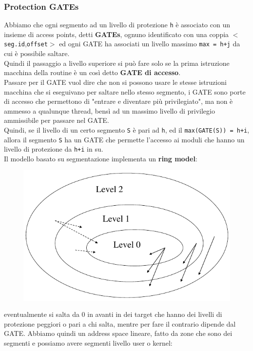 \documentclass[12pt, oneside]{extbook}
\begin{document}
\subsubsection{Protection GATEs} 
Abbiamo che ogni segmento ad un livello di protezione \texttt{h} è  associato con un insieme di access points, detti \textbf{GATEs}, ognuno identificato con una coppia $<$\texttt{seg.id},\texttt{offset}$>$ ed ogni GATE ha associati un livello massimo \texttt{max = h+j} da cui è possibile saltare.\\ Quindi il passaggio a livello superiore si può fare solo se la prima istruzione macchina della routine è un così detto \textbf{GATE di accesso}.\\Passare per il GATE vuol dire che non si possono usare le stesse istruzioni macchina che si eseguivano per saltare nello stesso segmento, i GATE sono porte di accesso che permettono di "entrare e diventare più privilegiato", ma non è ammesso a qualunque thread, bensì ad un massimo livello di privilegio ammissibile per passare nel GATE.\\ Quindi, se il livello di un certo segmento \texttt{S} è pari ad \texttt{h}, ed il \texttt{max(GATE(S)) = h+i}, allora il segmento \texttt{S} ha un GATE che permette l'accesso ai moduli che hanno un livello di protezione da \texttt{h+i} in su.\\Il modello basato su segmentazione implementa un \textbf{ring model}:
\begin{figure}[!h]
	\includegraphics[scale=0.3]{immagini/ring_model.png}
\end{figure}
eventualmente si salta da 0 in avanti in dei target che hanno dei livelli di protezione peggiori o pari a chi salta, mentre per fare il contrario dipende dal GATE. Abbiamo quindi un address space lineare, fatto da zone che sono dei segmenti e possiamo avere segmenti livello user o kernel:
\end{document}
